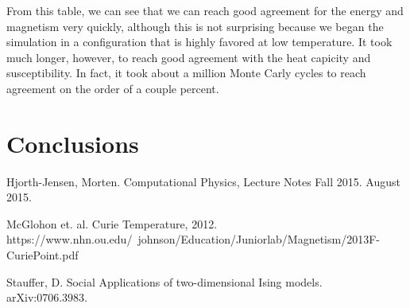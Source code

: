 \documentclass[%
oneside,                 %
final,                   %
10pt]{article}
\begin{document}
From this table, we can see that we can reach good agreement for the energy and magnetism very quickly, although this is not surprising because we began the simulation in a configuration that is highly favored at low temperature.  It took much longer, however, to reach good agreement with the heat capicity and susceptibility.  In fact, it took about a million Monte Carly cycles to reach agreement on the order of a couple percent.


\section{Conclusions}

\begin{thebibliography}{9}

Hjorth-Jensen, Morten. 
Computational Physics, Lecture Notes Fall 2015. 
August 2015.

McGlohon et. al.
Curie Temperature, 2012.
https://www.nhn.ou.edu/~johnson/Education/Juniorlab/Magnetism/2013F-CuriePoint.pdf

Stauffer, D.
Social Applications of two-dimensional Ising models.
arXiv:0706.3983.

\end{thebibliography}



\end{document}
